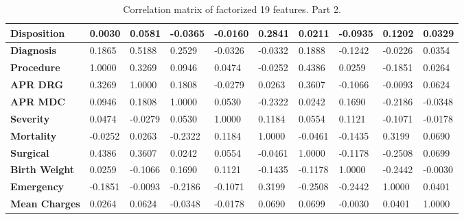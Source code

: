 \documentclass[10pt,twocolumn,letterpaper]{article}
\begin{document}
\begin{landscape}
\begin{table}[]
\begin{tabular}{|l|l|l|l|l|l|l|l|l|l|}
\textbf{Disposition}  & 0.0030             & 0.0581           & -0.0365          & -0.0160           & 0.2841             & 0.0211            & -0.0935               & 0.1202             & 0.0329                \\ \hline
\textbf{Diagnosis}    & 0.1865             & 0.5188           & 0.2529           & -0.0326           & -0.0332            & 0.1888            & -0.1242               & -0.0226            & 0.0354                \\ \hline
\textbf{Procedure}    & 1.0000             & 0.3269           & 0.0946           & 0.0474            & -0.0252            & 0.4386            & 0.0259                & -0.1851            & 0.0264                \\ \hline
\textbf{APR DRG}      & 0.3269             & 1.0000           & 0.1808           & -0.0279           & 0.0263             & 0.3607            & -0.1066               & -0.0093            & 0.0624                \\ \hline
\textbf{APR MDC}      & 0.0946             & 0.1808           & 1.0000           & 0.0530            & -0.2322            & 0.0242            & 0.1690                & -0.2186            & -0.0348               \\ \hline
\textbf{Severity}     & 0.0474             & -0.0279          & 0.0530           & 1.0000            & 0.1184             & 0.0554            & 0.1121                & -0.1071            & -0.0178               \\ \hline
\textbf{Mortality}    & -0.0252            & 0.0263           & -0.2322          & 0.1184            & 1.0000             & -0.0461           & -0.1435               & 0.3199             & 0.0690                \\ \hline
\textbf{Surgical}     & 0.4386             & 0.3607           & 0.0242           & 0.0554            & -0.0461            & 1.0000            & -0.1178               & -0.2508            & 0.0699                \\ \hline
\textbf{Birth Weight} & 0.0259             & -0.1066          & 0.1690           & 0.1121            & -0.1435            & -0.1178           & 1.0000                & -0.2442            & -0.0030               \\ \hline
\textbf{Emergency}    & -0.1851            & -0.0093          & -0.2186          & -0.1071           & 0.3199             & -0.2508           & -0.2442               & 1.0000             & 0.0401                \\ \hline
\textbf{Mean Charges} & 0.0264             & 0.0624           & -0.0348          & -0.0178           & 0.0690             & 0.0699            & -0.0030               & 0.0401             & 1.0000                \\ \hline
\end{tabular}
\caption{Correlation matrix of factorized 19 features. Part 2.}
\label{CM2}
\end{table}
\end{landscape}
\end{document}
